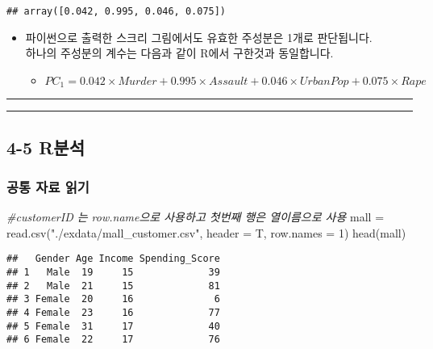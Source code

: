 \documentclass[
]{article}
\newenvironment{Shaded}{\begin{snugshade}}{\end{snugshade}}
\newcommand{\AttributeTok}[1]{\textcolor[rgb]{0.77,0.63,0.00}{#1}}
\newcommand{\CommentTok}[1]{\textcolor[rgb]{0.56,0.35,0.01}{\textit{#1}}}
\newcommand{\DecValTok}[1]{\textcolor[rgb]{0.00,0.00,0.81}{#1}}
\newcommand{\FunctionTok}[1]{\textcolor[rgb]{0.00,0.00,0.00}{#1}}
\newcommand{\NormalTok}[1]{#1}
\newcommand{\OtherTok}[1]{\textcolor[rgb]{0.56,0.35,0.01}{#1}}
\newcommand{\StringTok}[1]{\textcolor[rgb]{0.31,0.60,0.02}{#1}}
\providecommand{\tightlist}{%
  \setlength{\itemsep}{0pt}\setlength{\parskip}{0pt}}
\begin{document}
\begin{verbatim}
## array([0.042, 0.995, 0.046, 0.075])
\end{verbatim}

\begin{itemize}
\tightlist
\item
  파이썬으로 출력한 스크리 그림에서도 유효한 주성분은 1개로
  판단됩니다.\\
  하나의 주성분의 계수는 다음과 같이 R에서 구한것과 동일합니다.

  \begin{itemize}
  \tightlist
  \item
    \(PC_1 = 0.042 \times Murder + 0.995 \times Assault + 0.046 \times UrbanPop + 0.075 \times Rape\)
  \end{itemize}
\end{itemize}

\begin{center}\rule{0.5\linewidth}{0.5pt}\end{center}

\begin{center}\rule{0.5\linewidth}{0.5pt}\end{center}

\hypertarget{ruxbd84uxc11d}{%
\subsection{4-5 R분석}\label{ruxbd84uxc11d}}

\hypertarget{uxacf5uxd1b5-uxc790uxb8cc-uxc77duxae30}{%
\subsubsection{공통 자료
읽기}\label{uxacf5uxd1b5-uxc790uxb8cc-uxc77duxae30}}

\begin{Shaded}
\begin{Highlighting}[]
\CommentTok{\#customerID 는 row.name으로 사용하고 첫번째 행은 열이름으로 사용}
\NormalTok{mall }\OtherTok{=} \FunctionTok{read.csv}\NormalTok{(}\StringTok{"./exdata/mall\_customer.csv"}\NormalTok{, }\AttributeTok{header =}\NormalTok{ T, }\AttributeTok{row.names =} \DecValTok{1}\NormalTok{)}
\FunctionTok{head}\NormalTok{(mall)}
\end{Highlighting}
\end{Shaded}

\begin{verbatim}
##   Gender Age Income Spending_Score
## 1   Male  19     15             39
## 2   Male  21     15             81
## 3 Female  20     16              6
## 4 Female  23     16             77
## 5 Female  31     17             40
## 6 Female  22     17             76
\end{verbatim}
\end{document}
